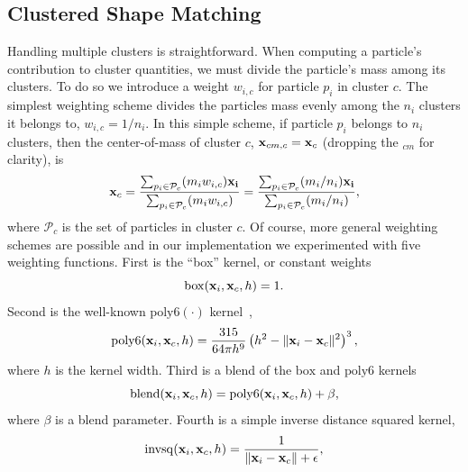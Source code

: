 \documentclass[review]{acmsiggraph}
\begin{document}
\subsection{Clustered Shape Matching}
Handling multiple clusters is straightforward.  When computing a particle's contribution to 
cluster quantities, we must divide the particle's mass among its clusters.  To do 
so we introduce a weight $w_{i,c}$ for particle $p_i$ in cluster $c$.  The simplest weighting
scheme divides the particles mass evenly among the $n_i$ clusters it belongs to, $w_{i,c} = 1/n_i$.
In this simple scheme, if particle $p_i$ belongs
to $n_i$ clusters, then the center-of-mass of cluster $c$, $\mathit{\mathbf{x}}_{cm,c} = \mathit{\mathbf{x}}_{c}$ (dropping the $_{cm}$ for clarity), is
\begin{equation}
\label{eq:com}
\mathit{\mathbf{x}}_{c} = \frac{\sum_{p_i\in\mathcal{P}_c}(m_iw_{i,c}) \mathit{\mathbf{x_i}}}{\sum_{p_i\in\mathcal{P}_c}(m_iw_{i,c})} = \frac{\sum_{p_i\in\mathcal{P}_c}(m_i/n_i) \mathit{\mathbf{x_i}}}{\sum_{p_i\in\mathcal{P}_c}(m_i/n_i)},
\end{equation}
where $\mathcal{P}_c$ is the set of particles in cluster $c$.
Of course, more general weighting schemes are possible and in our implementation we experimented with five weighting functions.
First is the ``box'' kernel, or constant weights
\begin{equation}
\label{eq:box}
\mathrm{box}(\mathit{\mathbf{x}}_i, \mathit{\mathbf{x}}_{c}, h) = 1.
\end{equation}
Second is the well-known $\mathrm{poly6}(\cdot)$ kernel~\cite{Mueller},
\begin{equation}
\label{eq:poly6}
\mathrm{poly6}(\mathit{\mathbf{x}}_i, \mathit{\mathbf{x}}_{c}, h) = \frac{315}{64\pi h^9}\left(h^2-\|\mathit{\mathbf{x}}_i-\mathit{\mathbf{x}}_{c}\|^2\right)^3,
\end{equation}
where $h$ is the kernel width.
Third is a blend of the $\mathrm{box}$ and $\mathrm{poly6}$ kernels
\begin{equation}
\label{blend}
\mathrm{blend}(\mathit{\mathbf{x}}_i, \mathit{\mathbf{x}}_{c}, h) = \mathrm{poly6}(\mathit{\mathbf{x}}_i, \mathit{\mathbf{x}}_{c}, h) + \beta,
\end{equation}
where $\beta$ is a blend parameter.
Fourth is a simple inverse distance squared kernel,
\begin{equation}
\label{eq:invdistancesquared}
\mathrm{invsq}(\mathit{\mathbf{x}}_i, \mathit{\mathbf{x}}_{c}, h) = \frac{1}{\|\mathit{\mathbf{x}}_i-\mathit{\mathbf{x}}_{c}\|+\epsilon},
\end{equation}
\end{document}
